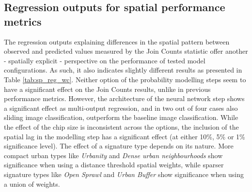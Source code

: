 \subsection*{Regression outputs for spatial performance metrics}
The regression outputs explaining differences in the spatial pattern between observed
and predicted values measured by the Join Counts statistic offer another - spatially
explicit - perspective on the performance of tested model configurations. As such, it
also indicates slightly different results as presented in Table \ref{tab:sp_reg_wc}.
Neither option of the probability modelling steps seem to have a significant effect on
the Join Counts results, unlike in previous performance metrics. However, the
architecture of the neural network step shows a significant effect as multi-output
regression, and in two out of four cases also sliding image classification, outperform the
baseline image classification. While the effect of the chip size is inconsistent across the
options, the inclusion of the spatial lag in the modelling step has a significant effect (at
either 10\%, 5\% or 1\% significance level). The effect of a signature type depends on
its nature. More compact urban types like \textit{Urbanity} and \textit{Dense
urban neighbourhoods} show significance when using a distance threshold spatial weights,
while sparser signature types like \textit{Open Sprawl} and \textit{Urban Buffer} show
significance when using a union of weights.



